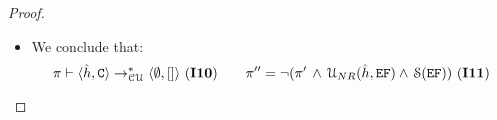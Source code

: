 \begin{proof}
\begin{itemize}
          \item {} We conclude that: 
                   $$
                   \pi \vdash \langle \hat{h}, \mathtt{C} \rangle \rightarrow^{*}_{\cal CU} \langle \emptyset, [] \rangle \text{ ({\bf I10})}
                   \qquad 
                   \pi'' = \neg(\pi' \, \wedge \, {\cal U}_{NR}(\hat{h}, \mathtt{EF}) \wedge \, {\cal S}(\mathtt{EF})) \text{ ({\bf I11})} 
                   $$ 
                 
\end{itemize}
\end{proof} 






